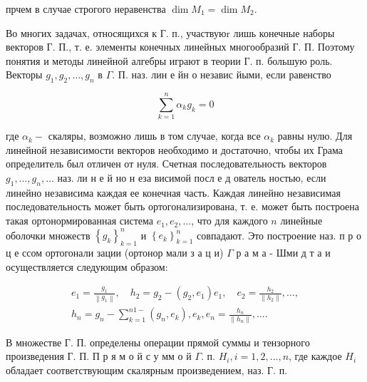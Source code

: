 \documentclass[10pt]{article}
\begin{document}
прчем в случае строгого неравенства $\operatorname{dim} M_{1}=\operatorname{dim} M_{2}$.



Во многих задачах, относящихся к Г. п., участвуюr лишь конечные наборы векторов Г. П., т. е. элементы конечных линейных многообразий Г. П. Поэтому понятия и методы линейной алгебры играют в теории Г. п. большую роль. Векторы $g_{1}, g_{2}, \ldots, g_{n}$ в $\Gamma$. П. наз. лин е йн о независ йыми, если равенство



\[

\sum_{k=1}^{n} \alpha_{k} g_{k}=0

\]



где $\alpha_{k}-$ скаляры, возможно лишь в том случае, когда все $\alpha_{k}$ равны нулю. Для линейной независимости векторов необходимо и достаточно, чтобы их Грама определитель был отличен от нуля. Счетная последовательность векторов $g_{1}, \ldots, g_{n}, \ldots$ наз. ли н е й но н еза висимой посл е д ователь ностью, если линейно независима каждая ее конечная часть. Каждая линейно независимая последовательность может быть ортогонализирована, т. е. может быть построена такая ортонормированная система $e_{1}, e_{2}, \ldots$, что для каждого $n$ линейные оболочки множеств $\left\{g_{k}\right\}_{k=1}^{n}$ и $\left\{e_{k}\right\}_{k=1}^{n}$ совпадают. Это построение наз. п р о ц е ссом ортогонали зации (ортонор мали з а ц и) $\Gamma$ р а м а - Шми д т а и осуществляется следующим образом:



\[

\begin{gathered}

e_{1}=\frac{g_{1}}{\left\|g_{1}\right\|}, \quad h_{2}=g_{2}-\left(g_{2}, e_{1}\right) e_{1}, \quad e_{2}=\frac{h_{2}}{\left\|h_{2}\right\|}, \ldots, \\

h_{n}=g_{n}-\sum_{k=1}^{n 1-}\left(g_{n}, e_{k}\right), e_{k}, e_{n}=\frac{h_{n}}{\left\|h_{n}\right\|}, \ldots .

\end{gathered}

\]



В множестве Г. П. определены операции прямой суммы и тензорного произведения Г. П. П р я м о й с у мм о й $\Gamma$. п. $H_{i}, i=1,2, \ldots, n$, где каждое $H_{i}$ обладает соответствующим скалярным произведением, наз. Г. п.
\end{document}
